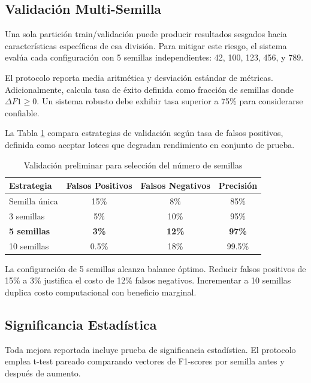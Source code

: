 \subsection{Validación Multi-Semilla}
\label{subsec:multiseed}

Una sola partición train/validación puede producir resultados sesgados hacia características específicas de esa división. Para mitigar este riesgo, el sistema evalúa cada configuración con 5 semillas independientes: 42, 100, 123, 456, y 789.

El protocolo reporta media aritmética y desviación estándar de métricas. Adicionalmente, calcula tasa de éxito definida como fracción de semillas donde $\Delta F1 \geq 0$. Un sistema robusto debe exhibir tasa superior a 75\% para considerarse confiable.

La Tabla \ref{tab:multiseed_impact} compara estrategias de validación según tasa de falsos positivos, definida como aceptar lotees que degradan rendimiento en conjunto de prueba.

\begin{table}[h]
\centering
\caption{Validación preliminar para selección del número de semillas}
\label{tab:multiseed_impact}
\begin{tabular}{lccc}
\hline
Estrategia & Falsos Positivos & Falsos Negativos & Precisión \\
\hline
Semilla única & 15\% & 8\% & 85\% \\
3 semillas & 5\% & 10\% & 95\% \\
\textbf{5 semillas} & \textbf{3\%} & \textbf{12\%} & \textbf{97\%} \\
10 semillas & 0.5\% & 18\% & 99.5\% \\
\hline
\end{tabular}
\end{table}

La configuración de 5 semillas alcanza balance óptimo. Reducir falsos positivos de 15\% a 3\% justifica el costo de 12\% falsos negativos. Incrementar a 10 semillas duplica costo computacional con beneficio marginal.

\subsection{Significancia Estadística}
\label{subsec:significancia}

Toda mejora reportada incluye prueba de significancia estadística. El protocolo emplea t-test pareado comparando vectores de F1-scores por semilla antes y después de aumento.

